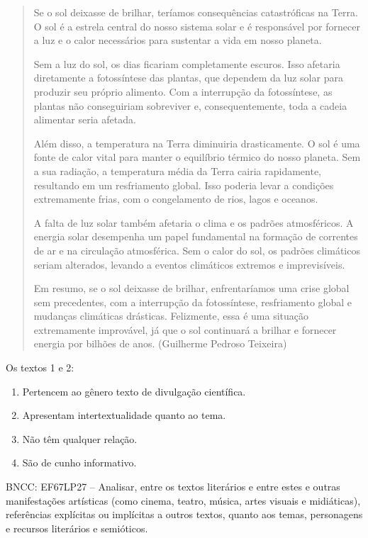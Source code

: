 \begin{quote}
Se o sol deixasse de brilhar, teríamos consequências catastróficas na
Terra. O sol é a estrela central do nosso sistema solar e é responsável
por fornecer a luz e o calor necessários para sustentar a vida em nosso
planeta.

Sem a luz do sol, os dias ficariam completamente escuros. Isso afetaria
diretamente a fotossíntese das plantas, que dependem da luz solar para
produzir seu próprio alimento. Com a interrupção da fotossíntese, as
plantas não conseguiriam sobreviver e, consequentemente, toda a cadeia
alimentar seria afetada.

Além disso, a temperatura na Terra diminuiria drasticamente. O sol é uma
fonte de calor vital para manter o equilíbrio térmico do nosso planeta.
Sem a sua radiação, a temperatura média da Terra cairia rapidamente,
resultando em um resfriamento global. Isso poderia levar a condições
extremamente frias, com o congelamento de rios, lagos e oceanos.

A falta de luz solar também afetaria o clima e os padrões atmosféricos.
A energia solar desempenha um papel fundamental na formação de correntes
de ar e na circulação atmosférica. Sem o calor do sol, os padrões
climáticos seriam alterados, levando a eventos climáticos extremos e
imprevisíveis.

Em resumo, se o sol deixasse de brilhar, enfrentaríamos uma crise global
sem precedentes, com a interrupção da fotossíntese, resfriamento global
e mudanças climáticas drásticas. Felizmente, essa é uma situação
extremamente improvável, já que o sol continuará a brilhar e fornecer
energia por bilhões de anos. (Guilherme Pedroso Teixeira)
\end{quote}

Os textos 1 e 2:

\begin{enumerate}
\def\labelenumi{\alph{enumi})}
\item Pertencem ao gênero texto de divulgação científica.
\item Apresentam intertextualidade quanto ao tema.
\item Não têm qualquer relação.
\item São de cunho informativo.
\end{enumerate}

BNCC: EF67LP27 -- Analisar, entre os textos literários e entre estes e
outras manifestações artísticas (como cinema, teatro, música, artes
visuais e midiáticas), referências explícitas ou implícitas a outros
textos, quanto aos temas, personagens e recursos literários e
semióticos.

